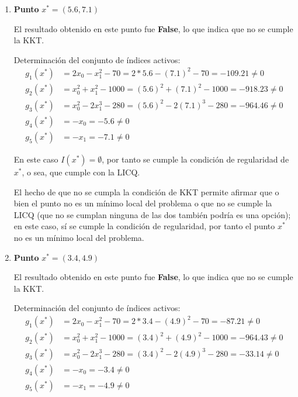 \documentclass[titlepage, 11pt]{scrartcl}
\begin{document}
\begin{enumerate}
\begin{enumerate}
\begin{enumerate}
			En este caso $I(x^*)  = \emptyset$, por tanto se cumple la condici\'on de regularidad de $x^*$, o sea, que cumple con la LICQ.
			
			El hecho de que no se cumpla la condición de KKT permite afirmar que o bien el punto no es un m\'inimo local del problema o que no se cumple la LICQ (que no se cumplan ninguna de las dos también podría es una opci\'on); en este caso, s\'i se cumple la condici\'on de regularidad, por tanto el punto $x^*$ no es un m\'inimo local del problema.
			
			
		\vspace{7mm}
		\item \textbf{Punto} $x^* = (5.6, 7.1)$
	
		El resultado obtenido en este punto fue \textbf{False}, lo que indica que no se cumple la KKT.
		
		Determinaci\'on del conjunto de \'indices activos:
		\begin{align*}
		g_1(x^*) &= 2x_0 - x_1^2 - 70 = 2 * 5.6 - (7.1)^2 - 70 = -109.21\neq 0\\
		g_2(x^*) &= x_0^2 + x_1^2- 1000 = (5.6)^2 + (7.1)^2 -1000 = -918.23 \neq 0\\
		g_3(x^*) &= x_0^2 - 2 x_1^3 - 280 = (5.6)^2 - 2(7.1)^3 - 280 = -964.46 \neq 0\\
		g_4(x^*) &= -x_0 = -5.6 \neq 0\\
		g_5(x^*) &= -x_1 = -7.1 \neq 0
		\end{align*}
		
		En este caso $I(x^*)  = \emptyset$, por tanto se cumple la condici\'on de regularidad de $x^*$, o sea, que cumple con la LICQ.
		
		El hecho de que no se cumpla la condición de KKT permite afirmar que o bien el punto no es un m\'inimo local del problema o que no se cumple la LICQ (que no se cumplan ninguna de las dos también podría es una opci\'on); en este caso, s\'i se cumple la condici\'on de regularidad, por tanto el punto $x^*$ no es un m\'inimo local del problema.
		
		\vspace{7mm}
		\item \textbf{Punto} $x^* = (3.4, 4.9)$
		
		El resultado obtenido en este punto fue \textbf{False}, lo que indica que no se cumple la KKT.
		
		Determinaci\'on del conjunto de \'indices activos:
		\begin{align*}
		g_1(x^*) &= 2x_0 - x_1^2 - 70 = 2 * 3.4 - (4.9)^2 - 70 = -87.21\neq 0\\
		g_2(x^*) &= x_0^2 + x_1^2- 1000 = (3.4)^2 + (4.9)^2 -1000 = -964.43 \neq 0\\
		g_3(x^*) &= x_0^2 - 2 x_1^3 - 280 = (3.4)^2 - 2(4.9)^3 - 280 = -33.14 \neq 0\\
		g_4(x^*) &= -x_0 = -3.4\neq 0\\
		g_5(x^*) &= -x_1 = -4.9\neq 0
		\end{align*}
		

\end{enumerate}
\end{enumerate}
\end{enumerate}
\end{document}
